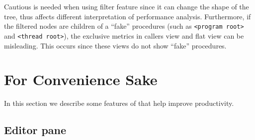 Cautious is needed when using filter feature since it can change the shape of the tree, thus affects different interpretation of performance analysis.
Furthermore, if the filtered nodes are children of a ``fake'' procedures (such as \texttt{<program root>} and \texttt{<thread root>}), the exclusive metrics in callers view and flat view can be misleading. 
This occurs since these views do not show ``fake'' procedures.



\section{For Convenience Sake}

In this section we describe some features of \hpcviewer{} that help improve productivity.


\subsection{Editor pane}

